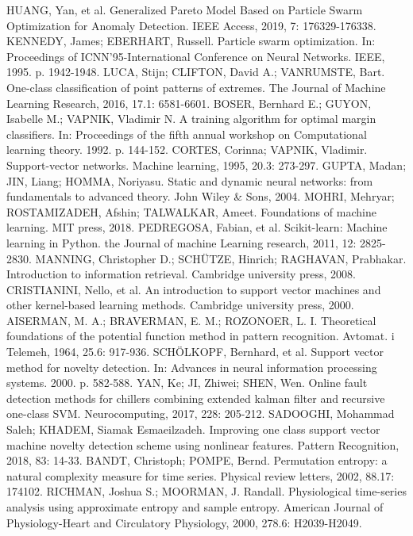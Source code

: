 \documentclass[11pt,twoside,openright]{report}
\begin{document}
\begin{thebibliography}{L}
HUANG, Yan, et al. Generalized Pareto Model Based on Particle Swarm Optimization for Anomaly Detection. IEEE Access, 2019, 7: 176329-176338.
KENNEDY, James; EBERHART, Russell. Particle swarm optimization. In: Proceedings of ICNN'95-International Conference on Neural Networks. IEEE, 1995. p. 1942-1948.
LUCA, Stijn; CLIFTON, David A.; VANRUMSTE, Bart. One-class classification of point patterns of extremes. The Journal of Machine Learning Research, 2016, 17.1: 6581-6601.
BOSER, Bernhard E.; GUYON, Isabelle M.; VAPNIK, Vladimir N. A training algorithm for optimal margin classifiers. In: Proceedings of the fifth annual workshop on Computational learning theory. 1992. p. 144-152.
CORTES, Corinna; VAPNIK, Vladimir. Support-vector networks. Machine learning, 1995, 20.3: 273-297.
GUPTA, Madan; JIN, Liang; HOMMA, Noriyasu. Static and dynamic neural networks: from fundamentals to advanced theory. John Wiley \& Sons, 2004.
MOHRI, Mehryar; ROSTAMIZADEH, Afshin; TALWALKAR, Ameet. Foundations of machine learning. MIT press, 2018.
PEDREGOSA, Fabian, et al. Scikit-learn: Machine learning in Python. the Journal of machine Learning research, 2011, 12: 2825-2830.
MANNING, Christopher D.; SCHÜTZE, Hinrich; RAGHAVAN, Prabhakar. Introduction to information retrieval. Cambridge university press, 2008.
CRISTIANINI, Nello, et al. An introduction to support vector machines and other kernel-based learning methods. Cambridge university press, 2000.
AISERMAN, M. A.; BRAVERMAN, E. M.; ROZONOER, L. I. Theoretical foundations of the potential function method in pattern recognition. Avtomat. i Telemeh, 1964, 25.6: 917-936.
SCHÖLKOPF, Bernhard, et al. Support vector method for novelty detection. In: Advances in neural information processing systems. 2000. p. 582-588.
YAN, Ke; JI, Zhiwei; SHEN, Wen. Online fault detection methods for chillers combining extended kalman filter and recursive one-class SVM. Neurocomputing, 2017, 228: 205-212.
SADOOGHI, Mohammad Saleh; KHADEM, Siamak Esmaeilzadeh. Improving one class support vector machine novelty detection scheme using nonlinear features. Pattern Recognition, 2018, 83: 14-33.
BANDT, Christoph; POMPE, Bernd. Permutation entropy: a natural complexity measure for time series. Physical review letters, 2002, 88.17: 174102.
RICHMAN, Joshua S.; MOORMAN, J. Randall. Physiological time-series analysis using approximate entropy and sample entropy. American Journal of Physiology-Heart and Circulatory Physiology, 2000, 278.6: H2039-H2049.

\end{thebibliography}
\end{document}
